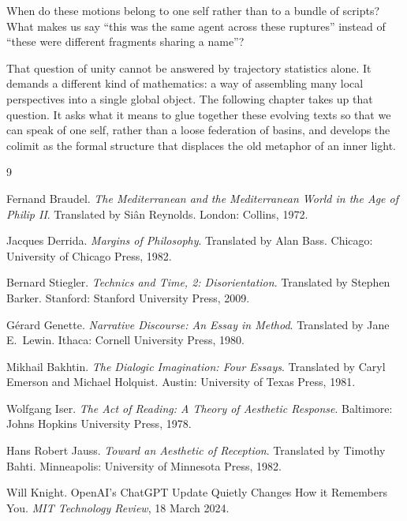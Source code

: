 When do these motions belong to one self rather than to a bundle of scripts? What makes us say ``this was the same agent across these ruptures'' instead of ``these were different fragments sharing a name''?

That question of unity cannot be answered by trajectory statistics alone. It demands a different kind of mathematics: a way of assembling many local perspectives into a single global object. The following chapter takes up that question. It asks what it means to glue together these evolving texts so that we can speak of one self, rather than a loose federation of basins, and develops the colimit as the formal structure that displaces the old metaphor of an inner light.


\begin{thebibliography}{9}

Fernand Braudel.
\newblock \emph{The Mediterranean and the Mediterranean World in the Age of Philip II}.
\newblock Translated by Si\^{a}n Reynolds. London: Collins, 1972.

Jacques Derrida.
\newblock \emph{Margins of Philosophy}.
\newblock Translated by Alan Bass. Chicago: University of Chicago Press, 1982.

Bernard Stiegler.
\newblock \emph{Technics and Time, 2: Disorientation}.
\newblock Translated by Stephen Barker. Stanford: Stanford University Press, 2009.

G\'erard Genette.
\newblock \emph{Narrative Discourse: An Essay in Method}.
\newblock Translated by Jane E.\ Lewin. Ithaca: Cornell University Press, 1980.

Mikhail Bakhtin.
\newblock \emph{The Dialogic Imagination: Four Essays}.
\newblock Translated by Caryl Emerson and Michael Holquist. Austin: University of Texas Press, 1981.

Wolfgang Iser.
\newblock \emph{The Act of Reading: A Theory of Aesthetic Response}.
\newblock Baltimore: Johns Hopkins University Press, 1978.

Hans Robert Jauss.
\newblock \emph{Toward an Aesthetic of Reception}.
\newblock Translated by Timothy Bahti. Minneapolis: University of Minnesota Press, 1982.

Will Knight.
\newblock OpenAI's ChatGPT Update Quietly Changes How it Remembers You.
\newblock \emph{MIT Technology Review}, 18 March 2024.

\end{thebibliography}
